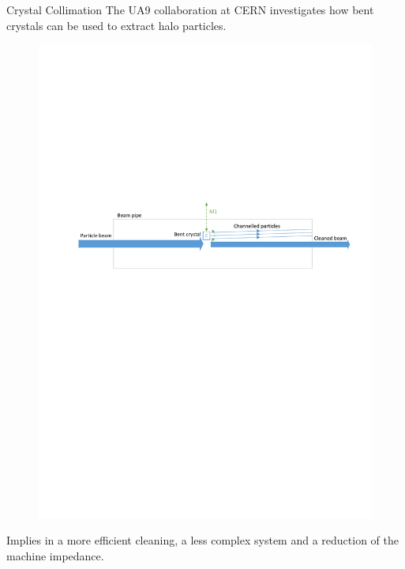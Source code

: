 \documentclass[10pt]{beamer}
\begin{document}
\begin{frame}[fragile]{Crystal Collimation}
  The UA9 collaboration at CERN investigates how bent crystals can be used to extract halo particles.

  \begin{figure}[h!]
    \centering %
    \includegraphics[width=1\textwidth, trim= 2cm 15.5cm 1cm 10cm, clip=true]{../fig/matlab/collimation}
  \end{figure}

  Implies in a more efficient cleaning, a less complex system and a reduction of the machine impedance.
\end{frame}
\end{document}
